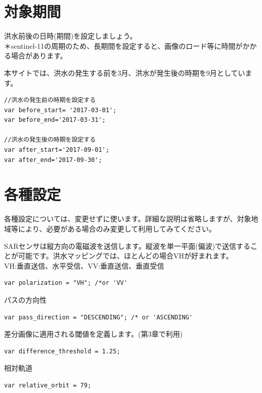 \documentclass[
]{book}
\begin{document}
\hypertarget{ux5bfeux8c61ux671fux9593}{%
\section{対象期間}\label{ux5bfeux8c61ux671fux9593}}

洪水前後の日時(期間)を設定しましょう。\\
＊sentinel-11の周期のため、長期間を設定すると、画像のロード等に時間がかかる場合があります。

本サイトでは、洪水の発生する前を3月、洪水が発生後の時期を9月としています。

\begin{verbatim}
//洪水の発生前の時期を設定する
var before_start= '2017-03-01';
var before_end='2017-03-31';

//洪水の発生後の時期を設定する
var after_start='2017-09-01';
var after_end='2017-09-30';
\end{verbatim}

\hypertarget{ux5404ux7a2eux8a2dux5b9a}{%
\section{各種設定　　}\label{ux5404ux7a2eux8a2dux5b9a}}

各種設定については、変更せずに使います。詳細な説明は省略しますが、対象地域等により、必要がある場合のみ変更して利用してみてください。

SARセンサは縦方向の電磁波を送信します。縦波を単一平面(偏波)で送信することが可能です。洪水マッピングでは、ほとんどの場合VHが好まれます。\\
VH:垂直送信、水平受信、VV:垂直送信、垂直受信

\begin{verbatim}
var polarization = "VH"; /*or 'VV' 
\end{verbatim}

パスの方向性

\begin{verbatim}
var pass_direction = "DESCENDING"; /* or 'ASCENDING'
\end{verbatim}

差分画像に適用される閾値を定義します。(第3章で利用)

\begin{verbatim}
var difference_threshold = 1.25;
\end{verbatim}

相対軌道

\begin{verbatim}
var relative_orbit = 79; 
\end{verbatim}
\end{document}
